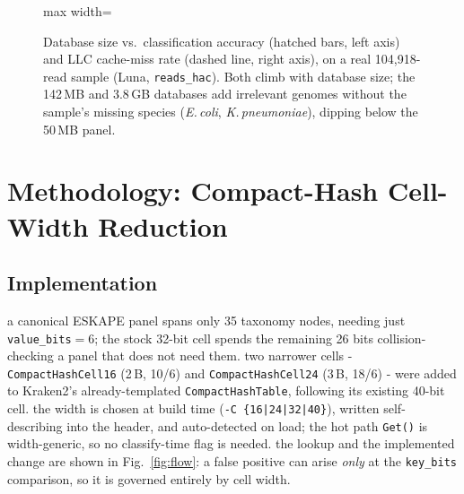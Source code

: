 \documentclass[10.5pt]{article}
\newcommand{\code}[1]{\texttt{\footnotesize #1}}
\begin{document}
\begin{figure}[h!]
\begin{adjustbox}{max width=\textwidth}
\end{adjustbox}
\caption{Database size vs.\ classification accuracy (hatched bars, left axis) and LLC cache-miss rate (dashed line, right axis), on a real 104{,}918-read sample (Luna, \code{reads\_hac}). Both climb with database size; the 142\,MB and 3.8\,GB databases add irrelevant genomes without the sample's missing species (\emph{E.\,coli}, \emph{K.\,pneumoniae}), dipping below the 50\,MB panel.}
\label{fig:dbsize}
\end{figure}

\section{Methodology: Compact-Hash Cell-Width Reduction}

\subsection{Implementation}
a canonical ESKAPE panel spans only 35 taxonomy nodes, needing just \code{value\_bits}$=6$; the stock 32-bit cell spends the remaining 26 bits collision-checking a panel that does not need them. two narrower cells - \code{CompactHashCell16} (2\,B, 10/6) and \code{CompactHashCell24} (3\,B, 18/6) - were added to Kraken2's already-templated \code{CompactHashTable}, following its existing 40-bit cell. the width is chosen at build time (\code{-C \{16|24|32|40\}}), written self-describing into the header, and auto-detected on load; the hot path \code{Get()} is width-generic, so no classify-time flag is needed. the lookup and the implemented change are shown in Fig.~\ref{fig:flow}: a false positive can arise \emph{only} at the \code{key\_bits} comparison, so it is governed entirely by cell width.
\end{document}
